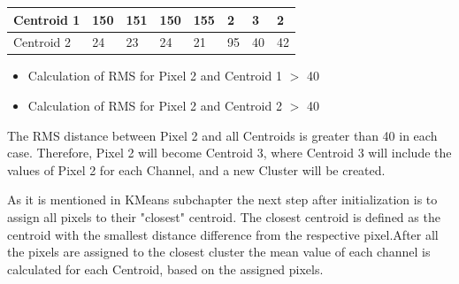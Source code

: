 \documentclass{article}
\begin{document}
{\begin{table}[h]
{\begin{tabular}{|p{2cm}|p{3cm}|p{3cm}|p{3cm}|p{3cm}|p{3cm}|p{3cm}|p{3cm}|}
                        \centering Centroid 1 &  \hspace*{1.1cm} 150 &  \hspace*{1.1cm} 151 &  \hspace*{1.1cm} 150 &  \hspace*{1.1cm} 155 &  \hspace*{1.1cm} 2 &  \hspace*{1.1cm} 3 &  \hspace*{1.1cm} 2  
                        \\
                        \hline
                        
                        \centering Centroid 2 &  \hspace*{1.2cm} 24 &  \hspace*{1.2cm} 23 &  \hspace*{1.2cm} 24 &  \hspace*{1.2cm} 21 &  \hspace*{1.1cm} 95 &  \hspace*{1.1cm} 40 &  \hspace*{1.1cm} 42  \\
                        \hline
                       \end{tabular}}
                    \end{table}
                    \begin{itemize}
                        \item Calculation of RMS for Pixel 2 and Centroid 1 $>$ 40
                        \item Calculation of RMS for Pixel 2 and Centroid 2 $>$ 40
                    \end{itemize}
                    
                    The RMS distance between Pixel 2 and all Centroids is greater than 40 in each case. Therefore, Pixel 2 will become Centroid 3, where Centroid 3 will include the values of Pixel 2 for each Channel, and a new Cluster will be created.\par
                    As it is mentioned in KMeans subchapter the next step after initialization is to assign all pixels to their "closest" centroid. The closest centroid is defined as the centroid with the smallest distance difference from the respective pixel.After all the pixels are assigned to the closest cluster the mean value of each channel is calculated for each Centroid, based on the assigned pixels.
                    
}
\end{document}
